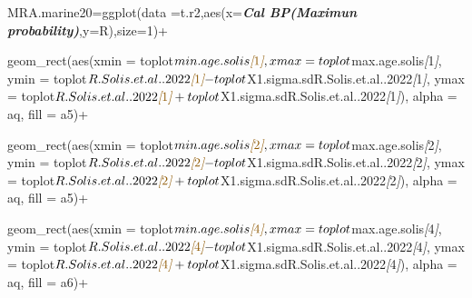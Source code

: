 \documentclass[
]{article}
\newenvironment{Shaded}{\begin{snugshade}}{\end{snugshade}}
\newcommand{\CommentTok}[1]{\textcolor[rgb]{0.56,0.35,0.01}{\textit{#1}}}
\newcommand{\InformationTok}[1]{\textcolor[rgb]{0.56,0.35,0.01}{\textbf{\textit{#1}}}}
\newcommand{\NormalTok}[1]{#1}
\newcommand{\OtherTok}[1]{\textcolor[rgb]{0.56,0.35,0.01}{#1}}
\begin{document}
\begin{Shaded}
\begin{Highlighting}[]
\NormalTok{MRA.marine20=ggplot(data =t.r2,aes(x=}\InformationTok{\textasciigrave{}Cal BP(Maximun probability)\textasciigrave{}}\NormalTok{,y=R),size=1)+}

\NormalTok{  geom\_rect(aes(xmin = toplot$min.age.solis}\CommentTok{[}\OtherTok{1}\CommentTok{]}\NormalTok{, }
\NormalTok{                xmax = toplot$max.age.solis}\CommentTok{[}\OtherTok{1}\CommentTok{]}\NormalTok{, }
\NormalTok{                ymin = toplot$R.Solis.et.al..2022}\CommentTok{[}\OtherTok{1}\CommentTok{]}\NormalTok{{-}toplot$X1.sigma.sdR.Solis.et.al..2022}\CommentTok{[}\OtherTok{1}\CommentTok{]}\NormalTok{,}
\NormalTok{                ymax = toplot$R.Solis.et.al..2022}\CommentTok{[}\OtherTok{1}\CommentTok{]}\NormalTok{+toplot$X1.sigma.sdR.Solis.et.al..2022}\CommentTok{[}\OtherTok{1}\CommentTok{]}\NormalTok{),}
\NormalTok{            alpha = aq,}
\NormalTok{            fill = a5)+}
  
\NormalTok{  geom\_rect(aes(xmin = toplot$min.age.solis}\CommentTok{[}\OtherTok{2}\CommentTok{]}\NormalTok{, }
\NormalTok{                xmax = toplot$max.age.solis}\CommentTok{[}\OtherTok{2}\CommentTok{]}\NormalTok{, }
\NormalTok{                ymin = toplot$R.Solis.et.al..2022}\CommentTok{[}\OtherTok{2}\CommentTok{]}\NormalTok{{-}toplot$X1.sigma.sdR.Solis.et.al..2022}\CommentTok{[}\OtherTok{2}\CommentTok{]}\NormalTok{,}
\NormalTok{                ymax = toplot$R.Solis.et.al..2022}\CommentTok{[}\OtherTok{2}\CommentTok{]}\NormalTok{+toplot$X1.sigma.sdR.Solis.et.al..2022}\CommentTok{[}\OtherTok{2}\CommentTok{]}\NormalTok{),}
\NormalTok{            alpha = aq,}
\NormalTok{            fill = a5)+}
 
\NormalTok{  geom\_rect(aes(xmin = toplot$min.age.solis}\CommentTok{[}\OtherTok{4}\CommentTok{]}\NormalTok{, }
\NormalTok{              xmax = toplot$max.age.solis}\CommentTok{[}\OtherTok{4}\CommentTok{]}\NormalTok{, }
\NormalTok{              ymin = toplot$R.Solis.et.al..2022}\CommentTok{[}\OtherTok{4}\CommentTok{]}\NormalTok{{-}toplot$X1.sigma.sdR.Solis.et.al..2022}\CommentTok{[}\OtherTok{4}\CommentTok{]}\NormalTok{,}
\NormalTok{              ymax = toplot$R.Solis.et.al..2022}\CommentTok{[}\OtherTok{4}\CommentTok{]}\NormalTok{+toplot$X1.sigma.sdR.Solis.et.al..2022}\CommentTok{[}\OtherTok{4}\CommentTok{]}\NormalTok{),}
\NormalTok{          alpha = aq,}
\NormalTok{          fill = a6)+}


\end{Highlighting}
\end{Shaded}
\end{document}
